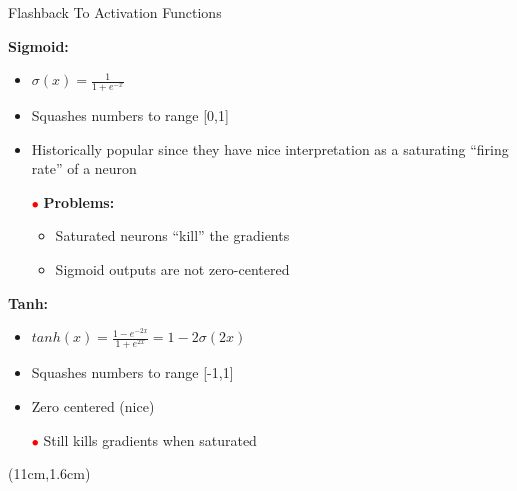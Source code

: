 \documentclass[serif, aspectratio=169]{beamer}
\begin{document}
\begin{frame}{Flashback To Activation Functions}
	
	\textbf{Sigmoid:} 
	\begin{itemize}
		\item $\sigma(x) = \frac{1}{1+e^{-x}}$
		\item Squashes numbers to range [0,1]
		\item Historically popular since they have nice interpretation \newline as a saturating “firing rate” of a neuron
		\item[\textcolor{red}{$\bullet$}] \color{red} \textbf{Problems:}
		\begin{itemize}
			\item \color{red} Saturated neurons “kill” the gradients
			\item \color{red} Sigmoid outputs are not zero-centered
		\end{itemize}
	\end{itemize}
	\textbf{Tanh:}
	\begin{itemize}
		\item $tanh(x) = \frac{1-e^{-2x}}{1+e^{2x}} = 1 - 2\sigma(2x)$
		\item Squashes numbers to range [-1,1]
		\item Zero centered (nice)
		\item[\textcolor{red}{$\bullet$}] \color{red} Still kills gradients when saturated
	\end{itemize}
	\begin{textblock*}{5cm}(11cm,1.6cm) %
	\begin{figure}[htbp]
		\begin{center}

\end{center}
\end{figure}
\end{textblock*}
\end{frame}
\end{document}
